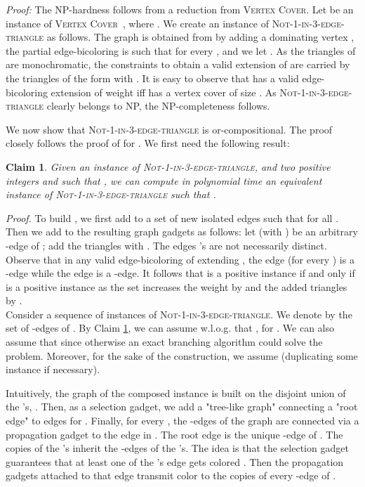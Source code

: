 \documentclass[11pt]{article}
\newenvironment{proof}{\noindent\textit{Proof: }}{{\hfill }}
\newtheorem{claim}[lemma]{Claim}
\newcommand{\gbc}{\textsc{Not-1-in-3-edge-triangle}}
\begin{document}
\begin{proof}
The NP-hardness follows from a reduction from \textsc{Vertex Cover}. Let  be an instance of \textsc{Vertex Cover}~\cite{GJ79}, where . We create an instance  of \gbc{} as follows. The graph  is obtained from  by adding a dominating vertex , the partial edge-bicoloring  is such that  for every , and we let . As the triangles of  are monochromatic, the constraints to obtain a valid extension of  are carried by the triangles of the form  with . It is easy to observe that  has a valid edge-bicoloring extension of weight  iff  has a vertex cover of size . As \gbc{} clearly belongs to NP, the NP-completeness follows. 


\medskip
We now show that \gbc{} is or-compositional. The proof closely follows the proof of \cite{KW09} for \notone{}. We first need the following result:

\begin{claim}\label{lemma1} 
Given  an instance  of \gbc{}, and two positive integers  and  such that , we can compute in polynomial time an equivalent instance  of \gbc{} such that .
\end{claim}

\emph{Proof.} To build , we first add to  a set  of  new isolated edges  such that  for all . Then we add to the resulting graph  gadgets as follows: let  (with ) be an arbitrary -edge of ; add the triangles  with . The edges 's are not necessarily distinct. Observe that in any valid edge-bicoloring of  extending , the edge  (for every ) is a -edge while the edge  is a -edge. It follows that  is a positive instance if and only if  is a positive instance as the set  increases the weight by  and the added triangles by .
\hfill  \\

Consider a sequence  of instances of \gbc{}. 
We denote by  the set of -edges of . 
By Claim \ref{lemma1}, we can assume w.l.o.g. that , for . We can also assume that  since otherwise an exact branching algorithm could solve the problem. Moreover, for the sake of the construction, we assume  (duplicating some instance  if necessary).


Intuitively, the graph  of the composed instance  is built on the disjoint union of the 's, .  Then, as a selection gadget, we add a "tree-like graph"  connecting a "root edge"  to edges  for . Finally, for every , the -edges of the graph  are connected via a propagation gadget to the edge  in . The root edge is the unique -edge of . The copies of the 's inherit the -edges of the 's. The idea is that the selection gadget guarantees that at least one of the 's edge gets colored . Then the propagation gadgets attached to that edge  transmit color  to the copies of every -edge of .


\end{proof}
\end{document}

